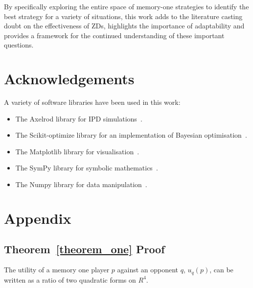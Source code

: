 \documentclass[10pt]{article}
\begin{document}
By specifically exploring the entire space of memory-one strategies to identify
the best strategy for a variety of situations, this work adds to the literature
casting doubt
on the effectiveness of ZDs, highlights the importance of adaptability and provides
a framework for the continued understanding of these important questions.

\section{Acknowledgements}

A variety of software libraries have been used in this work:

\begin{itemize}
    \item The Axelrod library for IPD simulations~\cite{axelrodproject}.
    \item The Scikit-optimize library for an implementation of Bayesian optimisation~\cite{tim_head_2018_1207017}.
    \item The Matplotlib library for visualisation~\cite{hunter2007matplotlib}.
    \item The SymPy library for symbolic mathematics~\cite{sympy}.
    \item The Numpy library for data manipulation~\cite{walt2011numpy}.
\end{itemize}




\section{Appendix}

\subsection{Theorem~\ref{theorem_one} Proof}\label{appendix:theorem_one}

The utility of a memory one player \(p\) against an opponent \(q\), \(u_q(p)\),
can be written as a ratio of two quadratic forms on \(R^4\).
\end{document}
